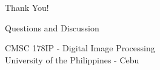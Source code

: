\documentclass[aspectratio=169,10pt]{beamer}
\begin{document}
\begin{frame}{}
    \begin{center}
        \Huge{Thank You!}

        \vspace{1cm}

        \Large{Questions and Discussion}

        \vspace{0.5cm}

        \normalsize{
            CMSC 178IP - Digital Image Processing \\
            University of the Philippines - Cebu
        }
    \end{center}
\end{frame}
\end{document}
